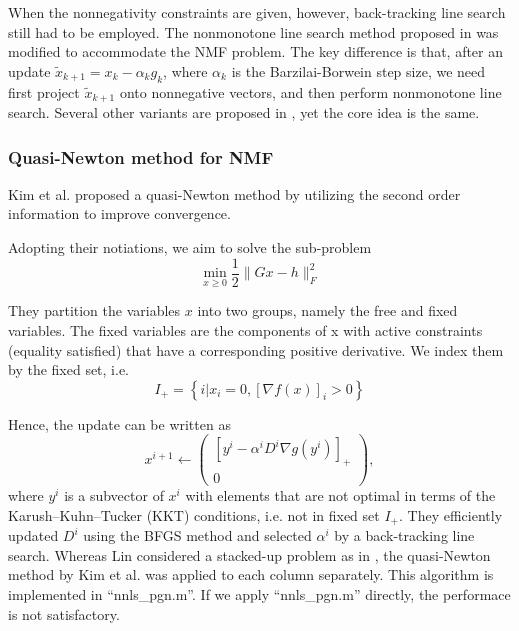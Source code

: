 \documentclass[conference,onecolumn,12pt]{IEEEtran}
\numberwithin{equation}{section}
\numberwithin{figure}{section}
\numberwithin{table}{section}
\theoremstyle{definition}
\begin{document}
When the nonnegativity constraints are given, however, back-tracking line search still had to be employed. The nonmonotone line search method proposed in \cite{Raydan} was modified to accommodate the NMF problem. The key difference is that, after an update $\tilde{x}_{k+1}=x_k-\alpha_k g_k$, where $\alpha_k$ is the Barzilai-Borwein step size, we need first project $\tilde{x}_{k+1}$ onto nonnegative vectors, and then perform nonmonotone line search. Several other variants are proposed in \cite{Lixing}, yet the core idea is the same.

\subsubsection{Quasi-Newton method for NMF}
\label{quasi-newton}
Kim et al. \cite{Sra} proposed a quasi-Newton method by utilizing the second order information to improve convergence.

Adopting their notiations, we aim to solve the sub-problem
\begin{equation*}
	\min_{x\geq 0} \frac{1}{2}\|Gx-h\|_F^2
\end{equation*}

They partition
the variables $x$ into two groups, namely the free and fixed variables.
The fixed variables are the components of x with active constraints (equality satisfied) that have a corresponding positive derivative. We index them by the
fixed set, i.e.
\begin{equation}
	I_{+}=\left\{
		i|x_i=0,[\nabla f (x)]_i>0
	\right\}
\end{equation}

Hence, the update can be written as
\begin{equation}
{x }^{i+1}\leftarrow \left(\begin{array}{c} \left[{y }^{i}-\alpha ^{i}{D }^{i}\nabla g({y }^{i})\right]_{+}\\  0 \end{array}\right),
\end{equation}
where $y^{i}$ is a subvector of $x^{i}$ with elements that are not optimal in terms of the Karush–Kuhn–Tucker (KKT) conditions, i.e. not in fixed set $I_{+}$. They efficiently updated $D^{i}$ using the BFGS method and selected $\alpha^{i}$ by a back-tracking line search. Whereas Lin considered a stacked-up problem as in \cite{6795860}, the quasi-Newton method by Kim et al. \cite{Sra} was applied to each column separately. This algorithm is implemented in ``nnls\_pgn.m''. If we apply ``nnls\_pgn.m'' directly, the performace is not satisfactory.
\end{document}
